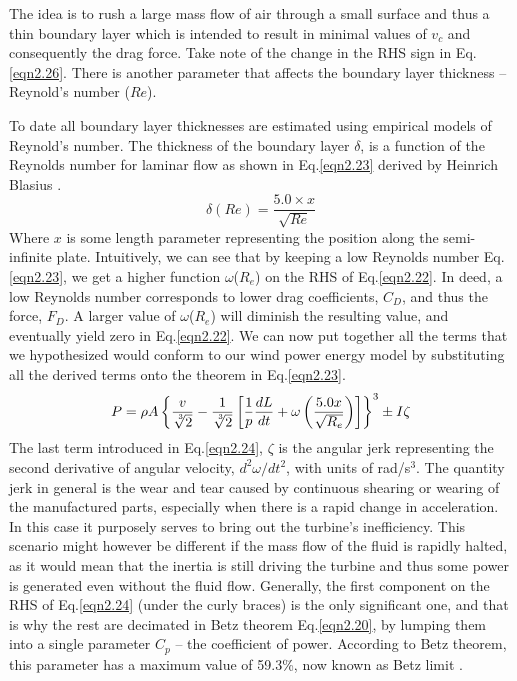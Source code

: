 \noindent The idea is to rush a large mass flow of air through a small surface and thus a thin boundary layer which is intended to result in minimal values of $v_c$ and consequently the drag force. Take note of the change in the RHS sign in Eq.\eqref{eqn2.26}. There is another parameter that affects the boundary layer thickness -- Reynold's number ($Re$). 

\noindent To date all boundary layer thicknesses are estimated using empirical models of Reynold's number. The thickness of the boundary layer $\delta$,  is a function of the Reynolds number for laminar flow as shown in Eq.\eqref{eqn2.23} derived by Heinrich Blasius \cite{blasius1907}.
\begin{equation}
\delta \left(Re\right) = \frac{5.0 \times x}{\sqrt{Re}}
\label{eqn2.23}
\end{equation} 
\noindent Where $x$ is some length parameter representing the position along the semi-infinite plate. Intuitively, we can see that by keeping a low Reynolds number Eq.\eqref{eqn2.23}, we get a higher function $\omega$($R_e$) on the RHS of Eq.\eqref{eqn2.22}. In deed, a low Reynolds number corresponds to lower drag coefficients, $C_D$, and thus the force, $F_D$. A larger value of $\omega$($R_e$) will diminish the resulting value, and eventually yield zero in Eq.\eqref{eqn2.22}. We can now put together all the terms that we hypothesized would conform to our wind power energy model by substituting all the derived terms onto the theorem in Eq.\eqref{eqn2.23}.
\begin{equation} 
P = \rho A \left\lbrace \frac{v}{\sqrt[\leftroot{-2}\uproot{2}3]{2}} - \frac{1}{\sqrt[\leftroot{-2}\uproot{2}3]{2}}\left[ \frac{1}{p}\frac{dL}{dt}+\omega \left( \frac{5.0 x}{\sqrt{R_e}}\right)  \right]  \right\rbrace^3 \pm I\zeta 
\label{eqn2.24}
\end{equation} 
\noindent The last term introduced in Eq.\eqref{eqn2.24}, $\zeta$ is the angular jerk representing the second derivative of angular velocity, $d^2\omega/dt^2$, with units of rad/s$^{3}$. The quantity jerk in general is the wear and tear caused by continuous shearing or wearing of the manufactured parts, especially when there is a rapid change in acceleration. In this case it purposely serves to bring out the turbine's inefficiency. This scenario might however be different if the mass flow of the fluid is rapidly halted, as it would mean that the inertia is still driving the turbine and thus some power is generated even without the fluid flow. Generally, the first component on the RHS of Eq.\eqref{eqn2.24} (under the curly braces) is the only significant one, and that is why the rest are decimated in Betz theorem Eq.\eqref{eqn2.20}, by lumping them into a single parameter $C_p$ -- the coefficient of power. According to Betz theorem, this parameter has a maximum value of 59.3\%, now known as Betz limit \cite{betz1920}. 

